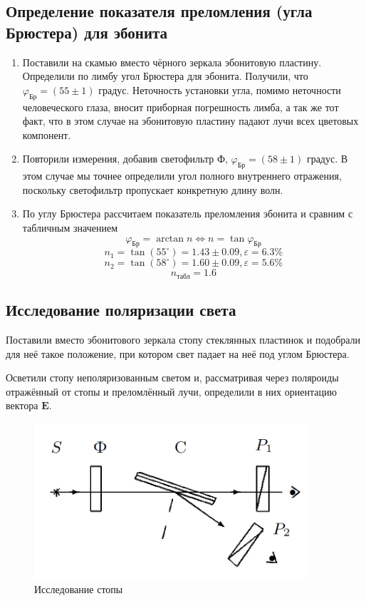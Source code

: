 \documentclass[a4paper,12pt]{article}
\begin{document}
\subsection{Определение показателя преломления (угла Брюстера) для эбонита}
\begin{enumerate}
    \item Поставили на скамью вместо чёрного зеркала эбонитовую пластину. Определили по лимбу угол Брюстера для эбонита. Получили, что $\varphi_{\text{Бр}}=(55\pm1)$ градус. Неточность установки угла, помимо неточности человеческого глаза, вносит приборная погрешность лимба, а так же тот факт, что в этом случае на эбонитовую пластину падают лучи всех цветовых компонент.

    \item Повторили измерения, добавив светофильтр $\text{Ф}$, $\varphi_{\text{Бр}}=(58\pm1)$ градус. В этом случае мы точнее определили угол полного внутреннего отражения, поскольку светофильтр пропускает конкретную длину волн.

    \item По углу Брюстера рассчитаем показатель преломления эбонита и сравним с табличным значением
    $$
    \varphi_{\text{Бр}}=\arctan{n} \Longleftrightarrow n=\tan{\varphi_{\text{Бр}}}
    $$
    $$
    n_1 = \tan{(55^\circ)} = 1.43\pm0.09, \varepsilon=6.3\%
    $$
    $$
    n_2 = \tan{(58^\circ)} = 1.60\pm0.09, \varepsilon=5.6\%
    $$
    $$
    n_\text{табл}=1.6
    $$
\end{enumerate}

\subsection{Исследование поляризации света}

Поставили вместо эбонитового зеркала стопу стеклянных пластинок и подобрали для неё такое положение, при котором свет падает на неё под углом Брюстера.

Осветили стопу неполяризованным светом и, рассматривая через поляроиды отражённый от стопы и преломлённый лучи, определили в них ориентацию вектора $\mathbf{E}$.

\begin{figure}[h]
\centering
\includegraphics[width=0.4\linewidth]{img5.png}
\caption{Исследование стопы}
\label{img5}
\end{figure}
\end{document}
